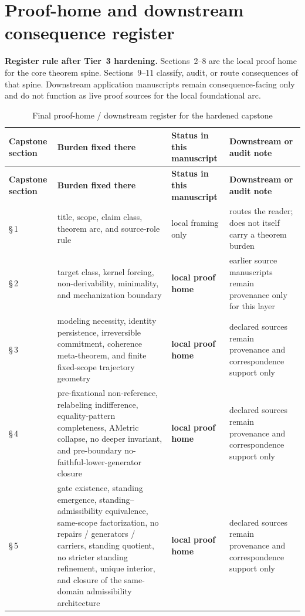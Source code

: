 \section{Proof-home and downstream consequence register}
\label{app:dependency-register}
\begin{fixedbox}
\textbf{Register rule after Tier~3 hardening.} Sections~2--8 are the local proof home for the core theorem spine. Sections~9--11 classify, audit, or route consequences of that spine. Downstream application manuscripts remain consequence-facing only and do not function as live proof sources for the local foundational arc.
\end{fixedbox}

\begin{longtable}{P{0.13\textwidth}P{0.26\textwidth}P{0.26\textwidth}P{0.22\textwidth}}
\caption{Final proof-home / downstream register for the hardened capstone}\\
\toprule
\textbf{Capstone section} & \textbf{Burden fixed there} & \textbf{Status in this manuscript} & \textbf{Downstream or audit note} \\
\midrule
\endfirsthead
\toprule
\textbf{Capstone section} & \textbf{Burden fixed there} & \textbf{Status in this manuscript} & \textbf{Downstream or audit note} \\
\midrule
\endhead
\bottomrule
\endfoot
\S\,1 & title, scope, claim class, theorem arc, and source-role rule & local framing only & routes the reader; does not itself carry a theorem burden \\
\S\,2 & target class, kernel forcing, non-derivability, minimality, and mechanization boundary & \textbf{local proof home} & earlier source manuscripts remain provenance only for this layer \\
\S\,3 & modeling necessity, identity persistence, irreversible commitment, coherence meta-theorem, and finite fixed-scope trajectory geometry & \textbf{local proof home} & declared sources remain provenance and correspondence support only \\
\S\,4 & pre-fixational non-reference, relabeling indifference, equality-pattern completeness, AMetric collapse, no deeper invariant, and pre-boundary no-faithful-lower-generator closure & \textbf{local proof home} & declared sources remain provenance and correspondence support only \\
\S\,5 & gate existence, standing emergence, standing--admissibility equivalence, same-scope factorization, no repairs / generators / carriers, standing quotient, no stricter standing refinement, unique interior, and closure of the same-domain admissibility architecture & \textbf{local proof home} & declared sources remain provenance and correspondence support only \\

\end{longtable}
